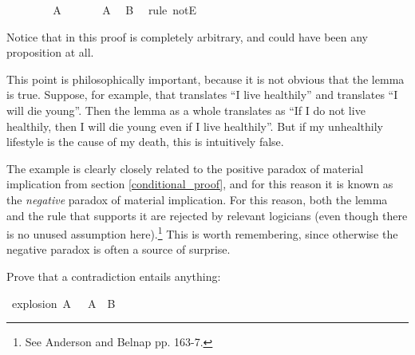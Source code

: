 \begin{isabellebody}
\ \ \isamarkupfalse%
\isanewline
\ \ \ \ \isamarkupfalse%
\ {\isachardoublequoteopen}A{\isachardoublequoteclose}\isanewline
\ \ \ \ \isamarkupfalse%
\ {\isacharbackquoteopen}{\isasymnot}\ A{\isacharbackquoteclose}\ \isamarkupfalse%
\ B\ \isamarkupfalse%
\ {\isacharparenleft}rule\ notE{\isacharparenright}\isanewline
\ \ \isamarkupfalse%
\isanewline
{}\isamarkupfalse%
%
\endisatagproof
{\isafoldproof}%
%
\isadelimproof
%
\endisadelimproof
%
\begin{isamarkuptext}%
Notice that  in this proof is completely arbitrary, and could have been any
proposition at all.%
\end{isamarkuptext}\isamarkuptrue%
%
\begin{isamarkuptext}%
This point is philosophically important, because it is not obvious that the lemma is true.
Suppose, for example, that  translates ``I live healthily'' and  translates ``I
will die young''. Then the lemma as a whole translates as ``If I do not live healthily, then I will
die young even if I live healthily''. But if my unhealthily lifestyle is the cause of my death,
this is intuitively false.%
\end{isamarkuptext}\isamarkuptrue%
%
\begin{isamarkuptext}%
The example is clearly closely related to the positive paradox of material implication from
section \ref{conditional_proof}, and for this reason it is known as the \emph{negative} paradox of
material implication. For this reason, both the lemma and the rule that supports it are rejected by
relevant logicians (even though there is no unused assumption here).\footnote{See Anderson and Belnap
\cite{anderson_entailment_1976} pp. 163-7.}
This is worth remembering, since otherwise the negative paradox is often a source of surprise.%
\end{isamarkuptext}\isamarkuptrue%
%
\begin{isamarkuptext}%
\begin{Exercise}[title = Explosion, label = explosion] Prove that a contradiction entails anything: \end{Exercise}%
\end{isamarkuptext}\isamarkuptrue%
\isamarkupfalse%
\ explosion{\isacharcolon}\ {\isachardoublequoteopen}A\ {\isasymand}\ {\isasymnot}\ A\ {\isasymlongrightarrow}\ B{\isachardoublequoteclose}%
\isadelimproof
\ %
\endisadelimproof
%
\isatagproof
{}\isamarkupfalse%

\end{isabellebody}
